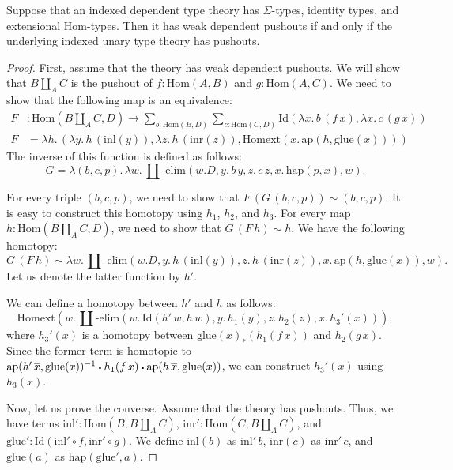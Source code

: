 \documentclass[reqno]{mscs}
\newcommand{\fs}[1]{\mathrm{#1}}
\newcommand{\Hom}{\fs{Hom}}
\newcommand{\Id}{\fs{Id}}
\newcommand{\sym}[1]{#1^{-1}}
\newcommand{\pmap}{\fs{ap}}
\newcommand{\Idext}{\fs{Homext}}
\numberwithin{figure}{section}
\newcommand{\ct}{%
  \mathchoice{\mathbin{\raisebox{0.25ex}{$\displaystyle\centerdot$}}}%
             {\mathbin{\raisebox{0.25ex}{$\centerdot$}}}%
             {\mathbin{\raisebox{0.25ex}{$\scriptstyle\,\centerdot\,$}}}%
             {\mathbin{\raisebox{0.25ex}{$\scriptscriptstyle\,\centerdot\,$}}}
}
\begin{document}
\begin{prop}
Suppose that an indexed dependent type theory has $\Sigma$-types, identity types, and extensional $\Hom$-types.
Then it has weak dependent pushouts if and only if the underlying indexed unary type theory has pushouts.
\end{prop}
\begin{proof}
First, assume that the theory has weak dependent pushouts.
We will show that $B \amalg_A C$ is the pushout of $f : \Hom(A,B)$ and $g : \Hom(A,C)$.
We need to show that the following map is an equivalence:
\begin{align*}
F & : \Hom(B \amalg_A C, D) \to \sum_{b : \Hom(B,D)} \sum_{c : \Hom(C,D)} \Id(\lambda x.\,b\,(f\,x), \lambda x.\,c\,(g\,x)) \\
F & = \lambda h.\,(\lambda y.\,h\,(\fs{inl}(y)), \lambda z.\,h\,(\fs{inr}(z)), \Idext(x.\,\pmap(h,\fs{glue}(x))))
\end{align*}
The inverse of this function is defined as follows:
\[ G = \lambda (b,c,p).\,\lambda w.\,\amalg\text{-}\fs{elim}(w.D, y.\,b\,y, z.\,c\,z, x.\,\fs{hap}(p,x), w). \]

For every triple $(b,c,p)$, we need to show that $F\,(G\,(b,c,p)) \sim (b,c,p)$.
It is easy to construct this homotopy using $h_1$, $h_2$, and $h_3$.
For every map $h : \Hom(B \amalg_A C, D)$, we need to show that $G\,(F\,h) \sim h$.
We have the following homotopy:
\[ G\,(F\,h) \sim \lambda w.\,\amalg\text{-}\fs{elim}(w.D, y.\,h\,(\fs{inl}(y)), z.\,h\,(\fs{inr}(z)), x.\,\pmap(h, \fs{glue}(x)), w). \]
Let us denote the latter function by $h'$.

We can define a homotopy between $h'$ and $h$ as follows:
\[ \Idext(w.\,\amalg\text{-}\fs{elim}(w.\,\Id(h'\,w,h\,w), y.\,h_1(y), z.\,h_2(z), x.\,h_3'(x))), \]
where $h_3'(x)$ is a homotopy between $\fs{glue}(x)_*(h_1(f\,x))$ and $h_2(g\,x)$.
Since the former term is homotopic to $\sym{\pmap(h'\,\overline{x},\fs{glue}(x))} \ct h_1(f\,x) \ct \pmap(h\,\overline{x},\fs{glue}(x))$, we can construct $h_3'(x)$ using $h_3(x)$.

Now, let us prove the converse.
Assume that the theory has pushouts.
Thus, we have terms $\fs{inl}' : \Hom(B, B \amalg_A C)$, $\fs{inr}' : \Hom(C, B \amalg_A C)$, and $\fs{glue}' : \Id(\fs{inl}' \circ f, \fs{inr}' \circ g)$.
We define $\fs{inl}(b)$ as $\fs{inl}'\,b$, $\fs{inr}(c)$ as $\fs{inr}'\,c$, and $\fs{glue}(a)$ as $\fs{hap}(\fs{glue}',a)$.


\end{proof}
\end{document}
